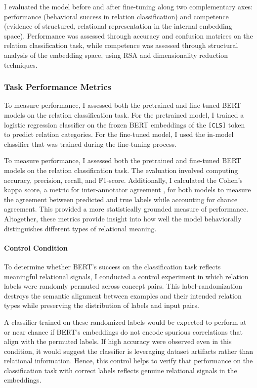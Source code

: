 \documentclass[stu,floatsintext]{apa7}
\begin{document}
I evaluated the model before and after fine-tuning along two complementary axes: performance (behavioral success in relation classification) and competence (evidence of structured, relational representation in the internal embedding space). Performance was assessed through accuracy and confusion matrices on the relation classification task, while competence was assessed through structural analysis of the embedding space, using RSA and dimensionality reduction techniques.

\subsubsection{Task Performance Metrics}

To measure performance, I assessed both the pretrained and fine-tuned BERT models on the relation classification task. For the pretrained model, I trained a logistic regression classifier on the frozen BERT embeddings of the \texttt{[CLS]} token to predict relation categories. For the fine-tuned model, I used the in-model classifier that was trained during the fine-tuning process.

To measure performance, I assessed both the pretrained and fine-tuned BERT models on the relation classification task. The evaluation involved computing accuracy, precision, recall, and F1-score. Additionally, I calculated the Cohen's kappa score, a metric for inter-annotator agreement \parencite{Cohen1960, Artstein2008}, for both models to measure the agreement between predicted and true labels while accounting for chance agreement. This provided a more statistically grounded measure of performance. Altogether, these metrics provide insight into how well the model behaviorally distinguishes different types of relational meaning.

\paragraph{Control Condition}

To determine whether BERT's success on the classification task reflects meaningful relational signals, I conducted a control experiment in which relation labels were randomly permuted across concept pairs. This label-randomization destroys the semantic alignment between examples and their intended relation types while preserving the distribution of labels and input pairs.

A classifier trained on these randomized labels would be expected to perform at or near chance if BERT's embeddings do not encode spurious correlations that align with the permuted labels. If high accuracy were observed even in this condition, it would suggest the classifier is leveraging dataset artifacts rather than relational information. Hence, this control helps to verify that performance on the classification task with correct labels reflects genuine relational signals in the embeddings.
\end{document}
